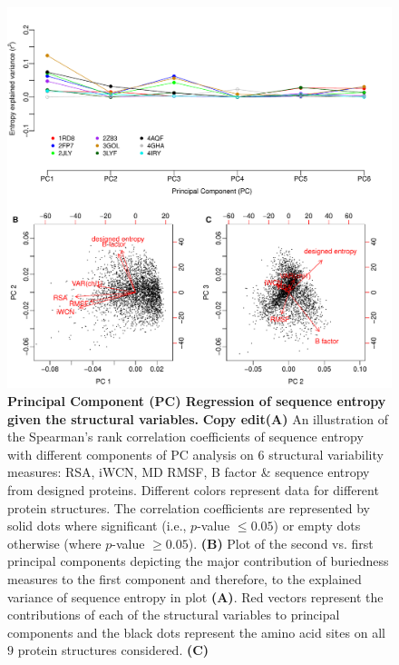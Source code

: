 \documentclass[12pt]{article}
\begin{document}
\begin{figure}[tbh]
\begin{center}
       \includegraphics[height=0.7\textheight]{cor_entropy_PC_screen.pdf}
\end{center}
\caption{\textbf{Principal Component (PC) Regression of sequence entropy given the structural variables.} {\color{blue}\textbf{Copy edit}{\bf (A)} An illustration of the Spearman's rank correlation coefficients of sequence entropy with different components of PC analysis on $6$ structural variability measures: RSA, iWCN, MD RMSF, B factor \& sequence entropy from designed proteins. Different colors represent data for different protein structures. The correlation coefficients are represented by solid dots where significant (i.e., $p$-value $\leq0.05$) or empty dots otherwise (where $p$-value $\geq0.05$). {\bf (B)} Plot of the second vs. first principal components depicting the major contribution of buriedness measures to the first component and therefore, to the explained variance of sequence entropy in plot {\bf (A)}. Red vectors represent the contributions of each of the structural variables to principal components and the black dots represent the amino acid sites on all $9$ protein structures considered. {\bf (C)}}}
\label{fig:cor_entropy_PC_screen}
\end{figure}
\end{document}
